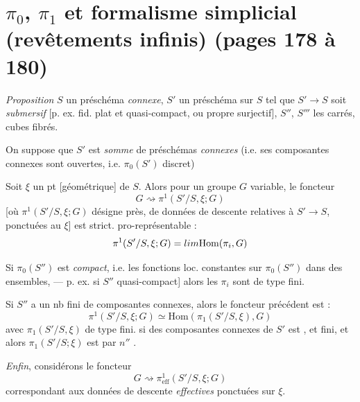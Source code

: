 \documentclass[11pt,a4paper]{article}
\begin{document}
\section*{$\pi_0$, $\pi_1$ et formalisme simplicial (revêtements infinis) (pages 178 à 180)}



\emph{Proposition} $S$ un préschéma \emph{connexe}, \struck{\ill{}}
$S'$ un préschéma sur $S$ tel que $S' \to S$ soit \emph{submersif}
[p. ex. fid. plat et quasi-compact, ou propre surjectif], $S''$, $S'''$ les
carrés, cubes fibrés.

On suppose que $S'$ est \emph{somme} de préschémas \emph{connexes} (i.e. ses
composantes connexes sont ouvertes, i.e. $\pi_0(S')$ discret)

Soit $\xi$ un pt [géométrique] de $S$. Alors pour un groupe 
$G$ variable, le foncteur
\[
  G \rightsquigarrow \pi^1(S'/S, \xi; G)
\]
 [où $\pi^1(S'/S,\xi;G)$ désigne  \ill{}  près, de données de descente
 relatives à $S' \to S$, ponctuées au $\xi$] est
strict. pro-représentable :
\[
  \pi^1(S'/S, \xi; G) = \varinjlim \mathrm{Hom}(\pi_i, G)
\]

Si $\pi_0(S'')$ est \emph{compact}, i.e. les fonctions loc.
constantes sur $\pi_0(S'')$ \ill{}  dans des
ensembles, --- p. ex. si $S''$ quasi-compact] \struck{\ill{}}
\struck{\ill{}} alors les $\pi_i$ sont de type fini.

Si $S''$ a un nb fini  de composantes connexes, alors le
foncteur précédent est  : \struck{\ill{}}
\[
  \pi^1(S'/S, \xi; G) \simeq \mathrm{Hom}(\pi_1(S'/S, \xi), G)
\]
avec $\pi_1(S'/S,\xi)$  \struck{\ill{}} de type
fini. \ill{} si \ill{} des composantes connexes de $S'$ est
, et \ill{} fini, et \struck{\ill{}} alors
$\pi_1(S'/S;\xi)$ est  par $n''$ .


\emph{Enfin}, considérons le \struck{\ill{}} foncteur
\[
  G \rightsquigarrow \pi^1_{\mathrm{eff}}(S'/S, \xi; G)
\]
correspondant aux \struck{\ill{}} données de descente \emph{effectives}
ponctuées sur $\xi$. \struck{\ill{}}
\end{document}
